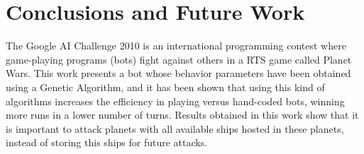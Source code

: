 \documentclass{llncs}
\begin{document}











%
\section{Conclusions and Future Work}
\label{sec:conclusions}

The Google AI Challenge 2010 is an international programming contest where game-playing programs (bots) fight against others in a RTS game called Planet Wars. This work presents a bot whose behavior parameters have been obtained using a Genetic Algorithm, and it has been shown that using this kind of algorithms increases the efficiency in playing versus hand-coded bots, winning more runs in a lower number of turns. Results obtained in this work show that it is important to attack planets with all available ships hosted in these planets, instead of storing this ships for future attacks.  
\end{document}
